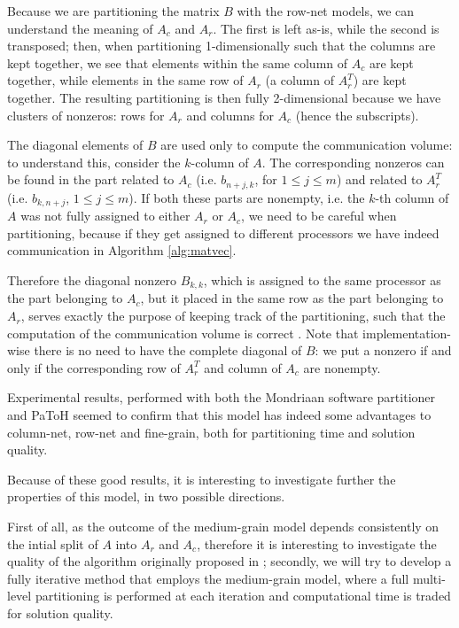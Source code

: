 Because we are partitioning the matrix $B$ with the row-net models, we can understand the meaning of $A_c$ and $A_r$. The first is left as-is, while the second is transposed; then, when partitioning 1-dimensionally such that the columns are kept together, we see that elements within the same column of $A_c$ are kept together, while elements in the same row of $A_r$ (a column of $A_r^T$) are kept together. The resulting partitioning is then fully 2-dimensional because we have clusters of nonzeros: rows for $A_r$ and columns for $A_c$ (hence the subscripts).

The diagonal elements of $B$ are used only to compute the communication volume: to understand this, consider the $k$-column of $A$. The corresponding nonzeros can be found in the part related to $A_c$ (i.e. $b_{n+j,k}$, for $1 \leq j \leq m$) and related to $A_r^T$ (i.e. $b_{k,n+j}$, $1 \leq j \leq m$). If both these parts are nonempty, i.e. the $k$-th column of $A$ was not fully assigned to either $A_r$ or $A_c$, we need to be careful when partitioning, because if they get assigned to different processors we have indeed communication in Algorithm \ref{alg:matvec}.

Therefore the diagonal nonzero $B_{k,k}$, which is assigned to the same processor as the part belonging to $A_c$, but it placed in the same row as the part belonging to $A_r$, serves exactly the purpose of keeping track of the partitioning, such that the computation of the communication volume is correct \cite[Th.~3.1]{mediumgrain}. Note that implementation-wise there is no need to have the complete diagonal of $B$: we put a nonzero if and only if the corresponding row of $A_r^T$ and column of $A_c$ are nonempty.

Experimental results, performed with both the Mondriaan software partitioner \cite{mondriaan} and PaToH \cite{patoh} seemed to confirm that this model has indeed some advantages to column-net, row-net and fine-grain, both for partitioning time and solution quality.

Because of these good results, it is interesting to investigate further the properties of this model, in two possible directions.

First of all, as the outcome of the medium-grain model depends consistently on the intial split of $A$ into $A_r$ and $A_c$, therefore it is interesting to investigate the quality of the algorithm originally proposed in \cite{mondriaan}; secondly, we will try to develop a fully iterative method that employs the medium-grain model, where a full multi-level partitioning is performed at each iteration and computational time is traded for solution quality.

